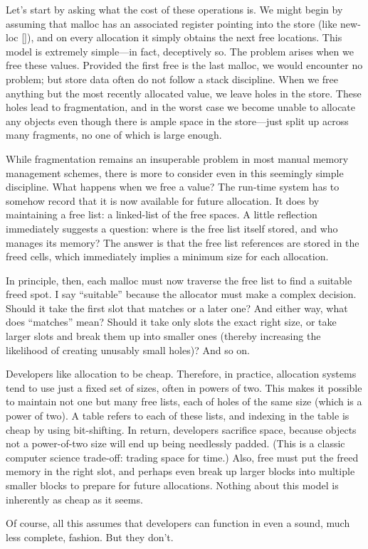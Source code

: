 
Let’s start by asking what the cost of these operations is. We might begin by
assuming that malloc has an associated register pointing into the store (like
new-loc \ref{}), and on every allocation it simply obtains the next free
locations. This model is extremely simple—in fact, deceptively so. The problem
arises when we free these values. Provided the first free is the last malloc, we
would encounter no problem; but store data often do not follow a stack
discipline. When we free anything but the most recently allocated value, we
leave holes in the store. These holes lead to fragmentation, and in the worst
case we become unable to allocate any objects even though there is ample space
in the store—just split up across many fragments, no one of which is large
enough.


While fragmentation remains an insuperable problem in most manual memory
management schemes, there is more to consider even in this seemingly simple
discipline. What happens when we free a value? The run-time system has to
somehow record that it is now available for future allocation. It does by
maintaining a free list: a linked-list of the free spaces. A little reflection
immediately suggests a question: where is the free list itself stored, and who
manages its memory? The answer is that the free list references are stored in
the freed cells, which immediately implies a minimum size for each allocation.

In principle, then, each malloc must now traverse the free list to find a
suitable freed spot. I say “suitable” because the allocator must make a complex
decision. Should it take the first slot that matches or a later one? And either
way, what does “matches” mean? Should it take only slots the exact right size,
or take larger slots and break them up into smaller ones (thereby increasing the
likelihood of creating unusably small holes)? And so on.

Developers like allocation to be cheap. Therefore, in practice, allocation
systems
tend to use just a fixed set of sizes, often in powers of two. This makes it
possible to maintain not one but many free lists, each of holes of the same size
(which is a power of two). A table refers to each of these lists, and indexing
in the table is cheap by using bit-shifting. In return, developers sacrifice
space, because objects not a power-of-two size will end up being needlessly
padded. (This is a classic computer science trade-off: trading space for time.)
Also, free must put the freed memory in the right slot, and perhaps even break
up larger blocks into multiple smaller blocks to prepare for future allocations.
Nothing about this model is inherently as cheap as it seems.

Of course, all this assumes that developers can function in even a sound, much
less complete, fashion. But they don’t.
